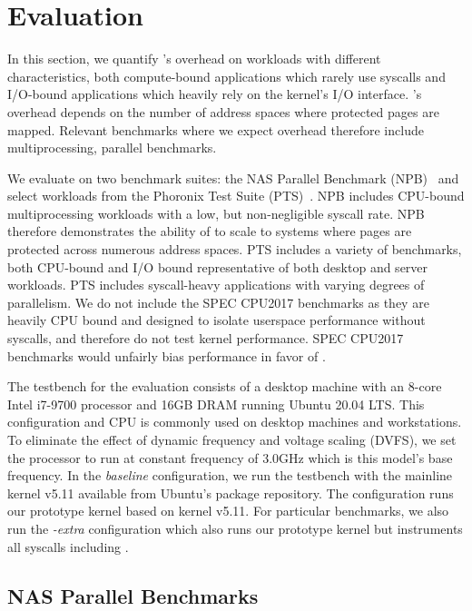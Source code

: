 \documentclass[letterpaper,twocolumn,10pt, anonymous]{article}
\begin{document}
\section{Evaluation}

In this section, we quantify \tiktok's overhead on workloads 
with different characteristics, both compute-bound applications
which rarely use syscalls and I/O-bound applications which 
heavily rely on the kernel's I/O interface.
\tiktok's overhead depends on the number of address spaces 
where protected pages are mapped. 
Relevant benchmarks where we expect overhead therefore include multiprocessing,
parallel benchmarks.

We evaluate \tiktok on two benchmark suites: the NAS Parallel 
Benchmark (NPB)~\cite{npb} and select workloads from the 
Phoronix Test Suite (PTS)~\cite{pts}. 
NPB includes CPU-bound multiprocessing workloads with a 
low, but non-negligible syscall rate. 
NPB therefore demonstrates the ability of \tiktok to 
scale to systems where pages are protected across numerous 
address spaces.
PTS includes a variety of benchmarks, both CPU-bound and 
I/O bound representative of both desktop and server workloads.
PTS includes syscall-heavy applications with varying degrees 
of parallelism.
We do not include the SPEC CPU2017 benchmarks
as they are heavily CPU bound and designed to isolate userspace 
performance without syscalls, and therefore do not test kernel 
performance. SPEC CPU2017 benchmarks would unfairly bias performance in favor of
\tiktok.

The testbench for the evaluation consists of a desktop machine 
with an 8-core Intel i7-9700 processor and 16GB DRAM running 
Ubuntu 20.04 LTS. This configuration and CPU is commonly used on desktop
machines and workstations.
%
To eliminate the effect of dynamic frequency and voltage 
scaling (DVFS), we set the processor to run at constant 
frequency of 3.0GHz which is this model's base frequency.
In the \emph{baseline} configuration, we run the testbench 
with the mainline kernel v5.11 available from Ubuntu's package 
repository.
The \emph{\tiktok} configuration runs our prototype \tiktok kernel 
based on kernel v5.11.
For particular benchmarks, we also run the \emph{\tiktok-extra}
configuration which also runs our prototype \tiktok kernel
but instruments all syscalls including .


\subsection{NAS Parallel Benchmarks}
\end{document}
